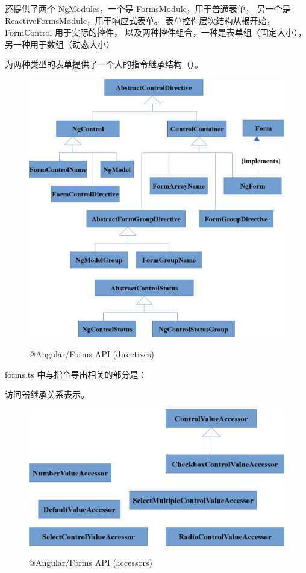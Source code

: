 还提供了两个 NgModules，一个是 FormsModule，用于普通表单，
另一个是 ReactiveFormsModule，用于响应式表单。
表单控件层次结构从根开始，FormControl 用于实际的控件，
以及两种控件组合，一种是表单组（固定大小），
另一种用于数组（动态大小）


为两种类型的表单提供了一个大的指令继承结构（）。

\begin{figure}[!hbt]
  \centering
  \caption{@Angular/Forms API (directives)}
  \includegraphics[width=0.75\linewidth]{15_the_forms_package/forms_api_directives}
  \label{fig:forms_api_directives}
\end{figure}


forms.ts 中与指令导出相关的部分是：




访问器继承关系表示。

\begin{figure}[!hbt]
  \centering
  \caption{@Angular/Forms API (accessors)}
  \includegraphics[width=0.75\linewidth]{15_the_forms_package/forms_api_accessors}
  \label{fig:forms_api_accessors}
\end{figure}

